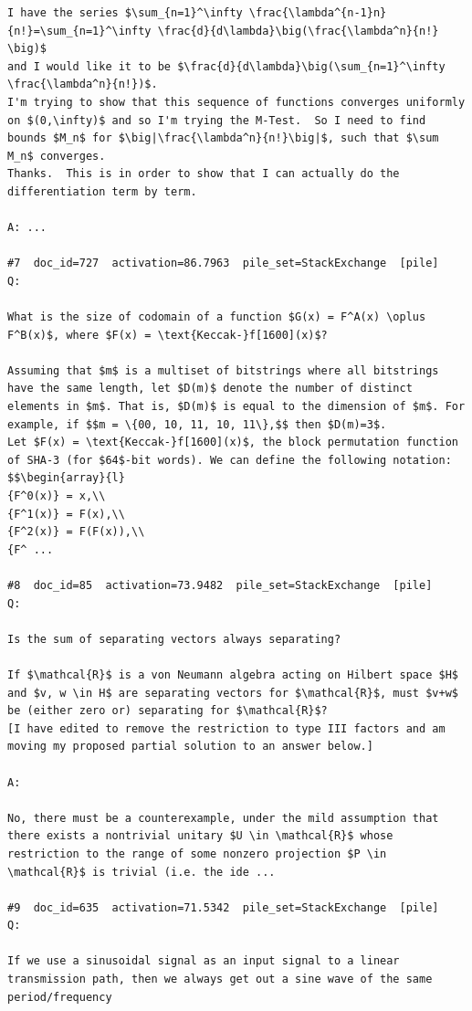\begin{verbatim}
I have the series $\sum_{n=1}^\infty \frac{\lambda^{n-1}n}{n!}=\sum_{n=1}^\infty \frac{d}{d\lambda}\big(\frac{\lambda^n}{n!} \big)$
and I would like it to be $\frac{d}{d\lambda}\big(\sum_{n=1}^\infty \frac{\lambda^n}{n!})$.
I'm trying to show that this sequence of functions converges uniformly on $(0,\infty)$ and so I'm trying the M-Test.  So I need to find bounds $M_n$ for $\big|\frac{\lambda^n}{n!}\big|$, such that $\sum M_n$ converges.
Thanks.  This is in order to show that I can actually do the differentiation term by term.

A: ...

#7  doc_id=727  activation=86.7963  pile_set=StackExchange  [pile]
Q:

What is the size of codomain of a function $G(x) = F^A(x) \oplus F^B(x)$, where $F(x) = \text{Keccak-}f[1600](x)$?

Assuming that $m$ is a multiset of bitstrings where all bitstrings have the same length, let $D(m)$ denote the number of distinct elements in $m$. That is, $D(m)$ is equal to the dimension of $m$. For example, if $$m = \{00, 10, 11, 10, 11\},$$ then $D(m)=3$.  
Let $F(x) = \text{Keccak-}f[1600](x)$, the block permutation function of SHA-3 (for $64$-bit words). We can define the following notation: $$\begin{array}{l}
{F^0(x)} = x,\\
{F^1(x)} = F(x),\\
{F^2(x)} = F(F(x)),\\
{F^ ...

#8  doc_id=85  activation=73.9482  pile_set=StackExchange  [pile]
Q:

Is the sum of separating vectors always separating?

If $\mathcal{R}$ is a von Neumann algebra acting on Hilbert space $H$ and $v, w \in H$ are separating vectors for $\mathcal{R}$, must $v+w$ be (either zero or) separating for $\mathcal{R}$?
[I have edited to remove the restriction to type III factors and am moving my proposed partial solution to an answer below.]

A:

No, there must be a counterexample, under the mild assumption that there exists a nontrivial unitary $U \in \mathcal{R}$ whose restriction to the range of some nonzero projection $P \in \mathcal{R}$ is trivial (i.e. the ide ...

#9  doc_id=635  activation=71.5342  pile_set=StackExchange  [pile]
Q:

If we use a sinusoidal signal as an input signal to a linear transmission path, then we always get out a sine wave of the same period/frequency


\end{verbatim}
